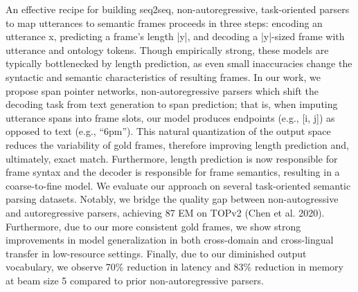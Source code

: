 An effective recipe for building seq2seq, non-autoregressive, task-oriented parsers to map utterances to semantic frames proceeds in three steps: encoding an utterance x, predicting a frame's length |y|, and decoding a |y|-sized frame with utterance and ontology tokens. Though empirically strong, these models are typically bottlenecked by length prediction, as even small inaccuracies change the syntactic and semantic characteristics of resulting frames. In our work, we propose span pointer networks, non-autoregressive parsers which shift the decoding task from text generation to span prediction; that is, when imputing utterance spans into frame slots, our model produces endpoints (e.g., [i, j]) as opposed to text (e.g., ``6pm''). This natural quantization of the output space reduces the variability of gold frames, therefore improving length prediction and, ultimately, exact match. Furthermore, length prediction is now responsible for frame syntax and the decoder is responsible for frame semantics, resulting in a coarse-to-fine model. We evaluate our approach on several task-oriented semantic parsing datasets. Notably, we bridge the quality gap between non-autogressive and autoregressive parsers, achieving 87 EM on TOPv2 (Chen et al. 2020). Furthermore, due to our more consistent gold frames, we show strong improvements in model generalization in both cross-domain and cross-lingual transfer in low-resource settings. Finally, due to our diminished output vocabulary, we observe 70\% reduction in latency and 83\% reduction in memory at beam size 5 compared to prior non-autoregressive parsers.
